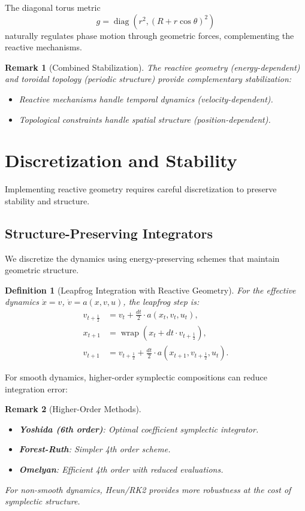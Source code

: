 \documentclass[12pt,letterpaper,twoside]{article}
\newtheorem{definition}{Definition}[section]
\newtheorem{remarque}{Remark}[section]
\DeclareMathOperator{\diag}{diag}
\begin{document}
The diagonal torus metric
\[
g = \diag\left(r^2, (R + r\cos\theta)^2\right)
\]
naturally regulates phase motion through geometric forces, complementing the reactive mechanisms.

\begin{remarque}[Combined Stabilization]
The reactive geometry (energy-dependent) and toroidal topology (periodic structure) provide complementary stabilization:
\begin{itemize}
\item Reactive mechanisms handle temporal dynamics (velocity-dependent).
\item Topological constraints handle spatial structure (position-dependent).
\end{itemize}
\end{remarque}

\section{Discretization and Stability}

Implementing reactive geometry requires careful discretization to preserve stability and structure.

\subsection{Structure-Preserving Integrators}

We discretize the dynamics using energy-preserving schemes that maintain geometric structure.

\begin{definition}[Leapfrog Integration with Reactive Geometry]
For the effective dynamics $\dot{x} = v$, $\dot{v} = a(x,v,u)$, the leapfrog step is:
\[
\begin{aligned}
v_{t+\frac{1}{2}} &= v_t + \frac{dt}{2} \cdot a(x_t, v_t, u_t), \\
x_{t+1} &= \operatorname{wrap}\left(x_t + dt \cdot v_{t+\frac{1}{2}}\right), \\
v_{t+1} &= v_{t+\frac{1}{2}} + \frac{dt}{2} \cdot a(x_{t+1}, v_{t+\frac{1}{2}}, u_t).
\end{aligned}
\]
\end{definition}

For smooth dynamics, higher-order symplectic compositions can reduce integration error:

\begin{remarque}[Higher-Order Methods]
\begin{itemize}
\item \textbf{Yoshida (6th order)}: Optimal coefficient symplectic integrator.
\item \textbf{Forest-Ruth}: Simpler 4th order scheme.
\item \textbf{Omelyan}: Efficient 4th order with reduced evaluations.
\end{itemize}
For non-smooth dynamics, Heun/RK2 provides more robustness at the cost of symplectic structure.
\end{remarque}
\end{document}
